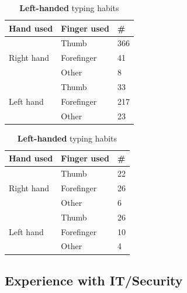     \begin{table}[H]
      \parbox{.5\linewidth}{
        \centering
        \begin{tabular}{ l | l | l }
          \hline
          {\bf Hand used} & {\bf Finger used} & {\bf \#} \\ \hline
          \multirow{3}{*}{Right hand} & Thumb & 366 \\
          & Forefinger & 41 \\
          & Other & 8 \\ \hline
          \multirow{3}{*}{Left hand} & Thumb & 33 \\
          & Forefinger & 217 \\
          & Other & 23 \\ \hline
        \end{tabular}
        \caption{{\bf Right-handed} typing habits}
        \label{tab:righthandfinger}
      }
      \hfill
      \parbox{.5\linewidth}{
        \centering
        \begin{tabular}{ l | l | l }
          \hline
          {\bf Hand used} & {\bf Finger used} & {\bf \#} \\ \hline
          \multirow{3}{*}{Right hand} & Thumb & 22 \\ 
          & Forefinger & 26 \\
          & Other & 6 \\ \hline
          \multirow{3}{*}{Left hand} & Thumb & 26 \\ 
          & Forefinger & 10 \\
          & Other & 4 \\ \hline
        \end{tabular}
        \caption{{\bf Left-handed} typing habits}
        \label{tab:lefthandfinger}
      }
    \end{table}

	\subsection{Experience with IT/Security}
		
